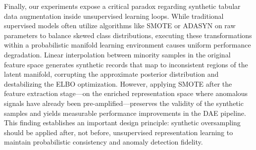 Finally, our experiments expose a critical paradox regarding synthetic tabular data augmentation inside unsupervised learning loops. While traditional supervised models often utilize algorithms like SMOTE or ADASYN on raw parameters to balance skewed class distributions, executing these transformations within a probabilistic manifold learning environment causes uniform performance degradation. Linear interpolation between minority samples in the original feature space generates synthetic records that map to inconsistent regions of the latent manifold, corrupting the approximate posterior distribution and destabilizing the ELBO optimization. However, applying SMOTE after the feature extraction stage---on the enriched representation space where anomalous signals have already been pre-amplified---preserves the validity of the synthetic samples and yields measurable performance improvements in the DAE pipeline. This finding establishes an important design principle: synthetic oversampling should be applied after, not before, unsupervised representation learning to maintain probabilistic consistency and anomaly detection fidelity.

% 
